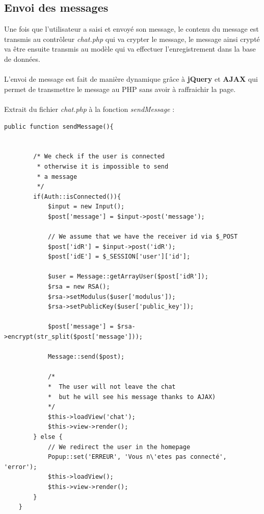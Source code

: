 \documentclass[12pt,a4paper]{report}
\begin{document}
\begin{itemize}
\subsection{Envoi des messages}
Une fois que l'utilisateur a saisi et envoyé son message, le contenu du message est transmis au contrôleur \textit{chat.php} qui va crypter le message, le message ainsi crypté va être ensuite transmis au modèle qui va effectuer l'enregistrement dans la base de données.
\paragraph{}
L'envoi de message est fait de manière dynamique grâce à \textbf{jQuery} et \textbf{AJAX} qui permet de transmettre le message au PHP sans avoir à raffraichir la page.
\paragraph{}
Extrait du fichier \textit{chat.php} à la fonction \textit{sendMessage} : 
\lstset{}
\begin{lstlisting}
public function sendMessage(){
        
        
        /* We check if the user is connected
         * otherwise it is impossible to send 
         * a message
         */
        if(Auth::isConnected()){
            $input = new Input();
            $post['message'] = $input->post('message');
            
            // We assume that we have the receiver id via $_POST
            $post['idR'] = $input->post('idR');
            $post['idE'] = $_SESSION['user']['id'];
            
            $user = Message::getArrayUser($post['idR']);
            $rsa = new RSA();
            $rsa->setModulus($user['modulus']);
            $rsa->setPublicKey($user['public_key']);
            
            $post['message'] = $rsa->encrypt(str_split($post['message']));
            
            Message::send($post);
            
            /* 
            *  The user will not leave the chat 
            *  but he will see his message thanks to AJAX)
            */
            $this->loadView('chat'); 
            $this->view->render();
        } else {
            // We redirect the user in the homepage
            Popup::set('ERREUR', 'Vous n\'etes pas connecté', 'error');
            $this->loadView();
            $this->view->render();
        }
    }
\end{lstlisting}

\end{itemize}
\end{document}
